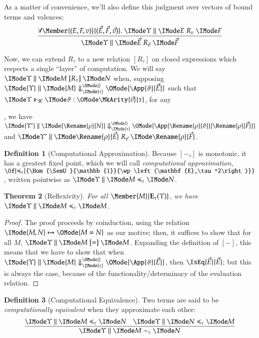 \documentclass[11pt]{article}
\newtheorem{thm}{Theorem}[section]
\theoremstyle{definition}
\newtheorem{definition}[thm]{Definition}
\theoremstyle{notation}
\theoremstyle{remark}
\numberwithin{equation}{section}
\newcommand\Pow[1]{\wp\left(#1\right)}
\newcommand\EvalN[5]{\IMode{#1}\parallel\IMode{#4}\Downarrow^{\OMode{#3}}_{\IMode{#2}}\OMode{#5}}
\newcommand\Eval[4]{\EvalN{#1}{#2}{}{#3}{#4}}
\newcommand\Exprs{\mathbf{E}}
\begin{document}
As a matter of convenience, we'll also define this judgment over vectors of
bound terms and valences:
\[
  \infer{
    \SBinRel{R_{\vec{v}}}{\Upsilon}{\vec{E}}{\vec{F}}
  }{
    \forall\Member{(E,F,v)}{(\vec{E},\vec{F},\vec{v})}.\
    \SBinRel{R_v}{\Upsilon}{E}{F}
  }
\]

Now, we can extend $R_\tau$ to a new relation $[R_\tau]$ on closed expressions
which respects a single ``layer'' of computation. We will say
$\SBinRel{[R_\tau]}{\Upsilon}{M}{N}$ when, supposing
$\Eval{\Upsilon}{\tau}{M}{\App{\vartheta}{\Vec{E}}}$ such that
$\IsCanOperator{\Upsilon}{\vartheta}{\MkArity{\vec{v}}{\tau}}$,
for any
, we have $\Eval{\Upsilon'}{\tau}{\Rename{\rho}{N}}{\App{\Rename{\rho}{\vartheta}}{\Rename{\rho}{\Vec{F}}}}$ and
$\SBinRel{R_{\vec{v}}}{\Upsilon'}{\Rename{\rho}{\vec{E}}}{\Rename{\rho}{\vec{F}}}$.

\begin{definition}[Computational Approximation]
  Because $[-_\tau]$ is monotonic, it has a greatest fixed point, which we will
  call \emph{computational approximation},
  $\Of{\preccurlyeq_\tau}{\Hom{\SemU}{\mathbb{1}}{\Pow{\Exprs_\tau^2}}}$,
  written pointwise as $\SBinRel{\preccurlyeq_\tau}{\Upsilon}{M}{N}$.
\end{definition}

\begin{thm}[Reflexivity]\label{thm:approx-refl}
  For all $\Member{M}{\Exprs_\tau(\Upsilon)}$, we have $\SBinRel{\preccurlyeq_\tau}{\Upsilon}{M}{M}$.
\end{thm}
\begin{proof}
  The proof proceeds by coinduction, using the relation
  $\IMode{M,N}\mapsto\OMode{M = N}$ as our motive; then, it suffices to show
  that for all $M$, $\SBinRel{[=]}{\Upsilon}{M}{M}$. Expanding the definition
  of $[-]$, this means that we have to show that when
  $\Eval{\Upsilon}{\tau}{M}{\App{\vartheta}{\vec{E}}}$, then
  $\IsEq{\vec{E}}{\vec{E}}$; but this is always the case, because of the
  functionality/determinacy of the evaluation relation.
\end{proof}

\begin{definition}[Computational Equivalence]
  Two terms are said to be \emph{computationally equivalent} when they approximate each other:
  \[
    \infer{
      \SBinRel{\sim_\tau}{\Upsilon}{M}{N}
    }{
      \SBinRel{\preccurlyeq_\tau}{\Upsilon}{M}{N} &
      \SBinRel{\preccurlyeq_\tau}{\Upsilon}{N}{M}
    }
  \]
\end{definition}
\end{document}
